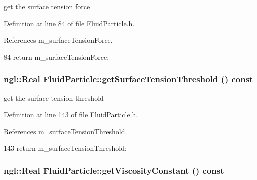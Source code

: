 get the surface tension force 



Definition at line 84 of file FluidParticle.h.



References m\_\-surfaceTensionForce.




\begin{DoxyCode}
84 { return m_surfaceTensionForce; }
\end{DoxyCode}


\hypertarget{class_fluid_particle_a76ca06b896d9e30ac34ec6ba9c326835}{
\subsubsection[{getSurfaceTensionThreshold}]{\setlength{\rightskip}{0pt plus 5cm}ngl::Real FluidParticle::getSurfaceTensionThreshold () const}}
\label{class_fluid_particle_a76ca06b896d9e30ac34ec6ba9c326835}


get the surface tension threshold 



Definition at line 143 of file FluidParticle.h.



References m\_\-surfaceTensionThreshold.




\begin{DoxyCode}
143 { return m_surfaceTensionThreshold; }
\end{DoxyCode}


\hypertarget{class_fluid_particle_abff9703a289af1a52f478462bb92a4c3}{
\subsubsection[{getViscosityConstant}]{\setlength{\rightskip}{0pt plus 5cm}ngl::Real FluidParticle::getViscosityConstant () const}}
\label{class_fluid_particle_abff9703a289af1a52f478462bb92a4c3}


